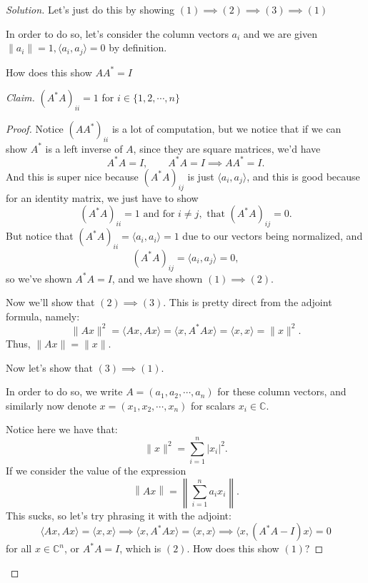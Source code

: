 \documentclass[11pt]{article}
\newcommand{\1}{\mathbf{1}}
\theoremstyle{definition}
\newenvironment{solution}{\begin{proof}[Solution]}{\end{proof}}
\begin{document}
\begin{solution}
    Let's just do this by showing \((1) \implies (2) \implies (3) \implies (1)\)
    \par In order to do so, let's consider the column vectors \(a_i\) and we are given
    \(\|a_i\| = 1, \langle a_i, a_j \rangle = 0\)
    by definition.
    \par How does this show \(AA^* = I\)
    \par
    \noindent\textit{Claim.} \((A^*A)_{ii} = 1\) for \(i \in \{1, 2,\cdots, n\}\)
    \begin{proof}
        Notice \((AA^*)_{ii}\) is a lot of computation, but we notice that if we can show \(A^*\) is a left inverse of \(A\), since they are square matrices, we'd have
        \[
        A^*A = I, \qquad A^*A = I \implies AA^* = I.
        \]
        And this is super nice because \((A^*A)_{ij}\) is just \(\langle a_i, a_j\rangle\),
        and this is good because for an identity matrix, we just have to show
        \[
        (A^*A)_{ii} = 1 \text{ and for } i \ne j, \text{ that } (A^*A)_{ij} = 0.
        \]
        But notice that \((A^*A)_{ii} = \langle a_i, a_i \rangle = 1\) due to our
        vectors being normalized, and
        \[
        (A^*A)_{ij} = \langle a_i, a_j\rangle = 0,
        \]
        so we've shown \(A^*A = I\), and we have shown \((1) \implies (2).\)

        \par Now we'll show that \((2) \implies (3)\).
        This is pretty direct from the adjoint formula, namely:
        \[
        \|Ax\|^2 = \langle Ax, Ax\rangle
        = \langle x, A^*Ax\rangle
        = \langle x, x\rangle
        = \|x\|^2.
        \]
        Thus, \(\|Ax\| = \|x\|\).

        \par Now let's show that \((3) \implies (1)\).
        \par In order to do so, we write \(A = (a_1, a_2, \cdots, a_n)\) for these column vectors,
        and similarly now denote \(x = (x_1, x_2, \cdots, x_n)\) for scalars \(x_i \in \mathbb{C}\).

        \par Notice here we have that:
        \[
        \|x\|^2 = \sum_{i=1}^{n} |x_i|^2.
        \]
        If we consider the value of the expression
        \[
        \left\lVert Ax\right\rVert
        = \left\lVert \sum_{i=1}^{n} a_i x_i\right\rVert.
        \]
        This sucks, so let's try phrasing it with the adjoint:
        \[
        \langle Ax, Ax\rangle = \langle x, x\rangle
        \implies \langle x, A^*A x\rangle = \langle x, x\rangle
        \implies \langle x, (A^*A-I)x\rangle = 0
        \]
        for all \(x \in \mathbb{C}^{n}\), or \(A^*A = I\), which is \((2)\). How does this show \((1)?\)


\end{proof}
\end{solution}
\end{document}
